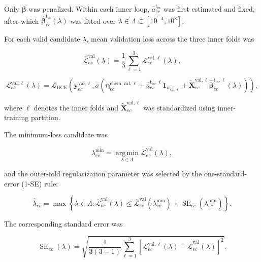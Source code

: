 \documentclass[11pt,a4paper]{article}
\begin{document}
Only $\boldsymbol\beta$ was penalized. Within each inner loop,
$\widehat a_{ec}^{\mathrm{t_{in}}}$ was first estimated and fixed, after
which $\widehat{\boldsymbol\beta}_{ec}^{\mathrm{t_{in}}}(\lambda)$ was
fitted over
$\lambda\in\Lambda\subset[10^{-4},10^{8}]$.

For each valid candidate \(\lambda\), mean validation loss across the three inner folds
was

\begin{equation}
\overline{\mathcal L}^{\mathrm{val}}_{ec}(\lambda)
=
\frac{1}{3}
\sum_{\ell=1}^{3}
\mathcal L^{\mathrm{val},\ell}_{ec}(\lambda),
\label{eq:mean-validation-loss}
\end{equation}

\begin{equation}
\mathcal L^{\mathrm{val},\ell}_{ec}(\lambda)
=
\mathcal L_{\mathrm{BCE}}
\!\left(
\mathbf y^{\mathrm{val},\ell}_{ec},
\sigma\!\left(
\boldsymbol\eta^{\mathrm{chem,val},\ell}_{ec}
+
\widehat a_{ec}^{\mathrm{t_{in}},\ell}
\mathbf 1_{n_{\mathrm{val},\ell}}
+
\widetilde{\mathbf X}^{\mathrm{val},\ell}_{ec}
\widehat{\boldsymbol\beta}_{ec}^{\mathrm{t_{in}},\ell}(\lambda)
\right)
\right),
\label{eq:inner-validation-loss}
\end{equation}

where $\ell$ denotes the inner folds and
$\widetilde{\mathbf X}^{\mathrm{val},\ell}_{ec}$ was standardized using inner-training partition.

The minimum-loss candidate was

\begin{equation}
\lambda^{\min}_{ec}
=
\operatorname*{arg\,min}_{\lambda\in\Lambda}
\overline{\mathcal L}^{\mathrm{val}}_{ec}(\lambda),
\label{eq:lambda-min}
\end{equation}

and the outer-fold regularization parameter was selected by the
one-standard-error (1-SE) rule:

\begin{equation}
\widehat\lambda_{ec}
=
\max
\left\{
\lambda\in\Lambda:
\overline{\mathcal L}^{\mathrm{val}}_{ec}(\lambda)
\le
\overline{\mathcal L}^{\mathrm{val}}_{ec}
\!\left(\lambda^{\min}_{ec}\right)
+
\operatorname{SE}_{ec}
\!\left(\lambda^{\min}_{ec}\right)
\right\}.
\label{eq:lambda-selection}
\end{equation}

The corresponding standard error was

\begin{equation}
\operatorname{SE}_{ec}(\lambda)
=
\sqrt{
\frac{1}{3(3-1)}
\sum_{\ell=1}^{3}
\left[
\mathcal L_{ec}^{\mathrm{val},\ell}(\lambda)
-
\overline{\mathcal L}_{ec}^{\mathrm{val}}(\lambda)
\right]^2
}.
\label{eq:validation-se}
\end{equation}
\end{document}
